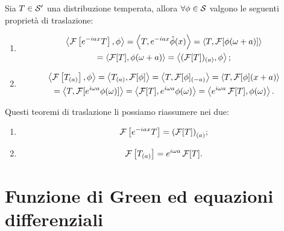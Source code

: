 Sia $ T \in \S'$ una distribuzione temperata, allora $ \forall \phi \in \S $ valgono le seguenti proprietà di traslazione:
\begin{enumerate}
  \item 
    \begin{gather}
      \sca{\F\left[ e^{-i a x} T \right], \phi} =  \sca{T, e^{-iax} \hat{\phi}(x)} 
      = \sca{T, \F[\phi(\omega + a)]} 
      \\
      = \sca{\F[T], \phi(\omega+a)}
      = \sca{(\F[T])_{(a)}, \phi};
    \end{gather}
  \item 
    \begin{gather}
      \sca{\F\left[ T_{(a)} \right], \phi} = \sca{T_{(a)}, \F[\phi]} = \sca{T, \F[\phi]_{(-a)}} = \sca{T, \F[\phi](x + a)}
      \\
      = \sca{T, \F[e^{i\omega a}\phi(\omega)]}  = \sca{\F[T], e^{i\omega a}\phi(\omega)} = \sca{e^{i\omega a}\F[T], \phi(\omega)}.
    \end{gather}
\end{enumerate}
Questi teoremi di traslazione li possiamo riassumere nei due:
\begin{enumerate}
  \item 
    \begin{gather}
      {\F\left[ e^{-i a x} T \right]} = {\left( \F[T] \right)_{(a)}};
    \end{gather}
  \item 
    \begin{gather}
      {\F\left[ T_{(a)} \right]} = {e^{i\omega a}\F[T]}.
    \end{gather}
\end{enumerate}

\chapter{Funzione di Green ed equazioni differenziali}

